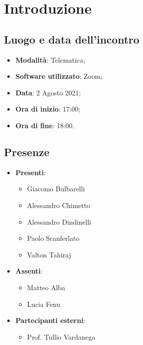 \documentclass[]{article}
\begin{document}
	

	\newpage


	\section{Introduzione}
	\subsection{Luogo e data dell'incontro}
	\begin{itemize}
		\item \textbf{Modalità}: Telematica;
		\item \textbf{Software utilizzato}: Zoom;
		\item \textbf{Data}: 2 Agosto 2021;
		\item \textbf{Ora di inizio}: 17:00;
		\item \textbf{Ora di fine}: 18:00.
	\end{itemize}

	\subsection{Presenze}
	\begin{itemize}
		\item \textbf{Presenti}:
		\begin{itemize}
			\item Giacomo Bulbarelli
			\item Alessandro Chimetto
			\item Alessandro Dindinelli
			\item Paolo Scanferlato
            \item Valton Tahiraj

		\end{itemize}
		\item \textbf{Assenti}:
		\begin{itemize}
			\item Matteo Alba
			\item Lucia Fenu

		\end{itemize}
		\item \textbf{Partecipanti esterni}:
		\begin{itemize}
			\item Prof. Tullio Vardanega
		\end{itemize}
	\end{itemize}
\end{document}

